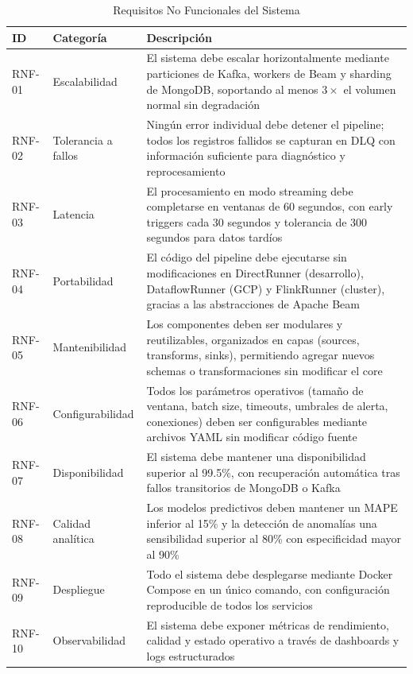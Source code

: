 \documentclass[12pt,a4paper]{article}
\begin{document}
\begin{table}[H]
    \centering
    \caption{Requisitos No Funcionales del Sistema}
    \begin{tabular}{@{}p{1.5cm}p{3cm}p{10cm}@{}}
        \toprule
        \textbf{ID} & \textbf{Categoría}  & \textbf{Descripción}                                                                                                                                                                 \\
        \midrule
        RNF-01      & Escalabilidad       & El sistema debe escalar horizontalmente mediante particiones de Kafka, workers de Beam y sharding de MongoDB, soportando al menos $3\times$ el volumen normal sin degradación        \\
        RNF-02      & Tolerancia a fallos & Ningún error individual debe detener el pipeline; todos los registros fallidos se capturan en DLQ con información suficiente para diagnóstico y reprocesamiento                      \\
        RNF-03      & Latencia            & El procesamiento en modo streaming debe completarse en ventanas de 60 segundos, con early triggers cada 30 segundos y tolerancia de 300 segundos para datos tardíos                  \\
        RNF-04      & Portabilidad        & El código del pipeline debe ejecutarse sin modificaciones en DirectRunner (desarrollo), DataflowRunner (GCP) y FlinkRunner (cluster), gracias a las abstracciones de Apache Beam     \\
        RNF-05      & Mantenibilidad      & Los componentes deben ser modulares y reutilizables, organizados en capas (sources, transforms, sinks), permitiendo agregar nuevos schemas o transformaciones sin modificar el core  \\
        RNF-06      & Configurabilidad    & Todos los parámetros operativos (tamaño de ventana, batch size, timeouts, umbrales de alerta, conexiones) deben ser configurables mediante archivos YAML sin modificar código fuente \\
        RNF-07      & Disponibilidad      & El sistema debe mantener una disponibilidad superior al 99.5\%, con recuperación automática tras fallos transitorios de MongoDB o Kafka                                              \\
        RNF-08      & Calidad analítica   & Los modelos predictivos deben mantener un MAPE inferior al 15\% y la detección de anomalías una sensibilidad superior al 80\% con especificidad mayor al 90\%                        \\
        RNF-09      & Despliegue          & Todo el sistema debe desplegarse mediante Docker Compose en un único comando, con configuración reproducible de todos los servicios                                                  \\
        RNF-10      & Observabilidad      & El sistema debe exponer métricas de rendimiento, calidad y estado operativo a través de dashboards y logs estructurados                                                              \\
        \bottomrule
    \end{tabular}
\end{table}
\end{document}
